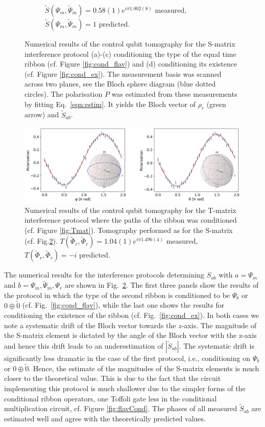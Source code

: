 \documentclass[a4paper,twocolumn,11pt, accepted=2024-06-14]{quantumarticle}
\begin{document}
\begin{figure}
\begin{subfigure}{\textwidth}
        \caption{$\tilde{S}(\Psi_m, \tilde{\Psi}_m) = 0.58(1)e^{i\pi 1.002(8)}$ measured, $\tilde{S}(\Psi_m, \tilde{\Psi}_m)=1$ predicted.}
        \label{fig:ex_cond_res_zero}
    \end{subfigure}
    \caption{Numerical results of the control qubit tomography for the S-matrix interference protocol (a)-(c) conditioning the type of the equal time ribbon (cf. Figure \ref{fig:cond_flav}) and (d) conditioning its existence (cf. Figure \ref{fig:cond_ex}). The measurement basis was scanned across two planes, see the Bloch sphere diagram (blue dotted circles). The polarisation $P$ was estimated from these measurements by fitting Eq.~\eqref{eqn:estim}. It yields the Bloch vector of $\rho_c$ (green arrow) and $\tilde S_{ab}$.}
    \label{fig:S_res}
\end{figure}
\begin{figure}
    \centering
    \includegraphics[width=\textwidth]{Figures/t_j_minus.pdf}
    \caption{Numerical results of the control qubit tomography for the T-matrix interference protocol where the paths of the ribbon was conditioned (cf. Figure \ref{fig:Tmat}). Tomography performed as for the S-matrix (cf. Fig.\ref{fig:S_res}).  $T(\tilde{\Phi}_r, \tilde{\Phi}_r) = 1.04(1)e^{i\pi 1.496(4)}$ measured, $T(\tilde{\Phi}_r, \tilde{\Phi}_r) = -i$ predicted.}
    \label{fig:t_mat_results}
\end{figure}
The numerical results for the interference protocols determining $S_{ab}$ with $a=\Psi_m$ and $b=\Psi_m,\tilde \Psi_m, \Psi_r$ are shown in Fig.~\ref{fig:S_res}. The first three panels show the results of the protocol in which the type of the second ribbon is conditioned to be $\Psi_b$ or $0 \oplus \tilde 0$ (cf. Fig.~\ref{fig:cond_flav}), while the last one shows the results for conditioning the existence of the ribbon (cf. Fig.~\ref{fig:cond_ex}). In both cases we note a systematic drift of the Bloch vector towards the $z$-axis. The magnitude of the S-matrix element is dictated by the angle of the Bloch vector with the z-axis and hence this drift leads to an underestimation of $|\tilde S_{ab}|$. The systematic drift is significantly less dramatic in the case of the first protocol, i.e., conditioning on $\Psi_b$ or $0 \oplus \tilde 0$.  Hence, the estimate of the magnitudes of the S-matrix elements is much closer to the theoretical value. 
 This is due to the fact that the circuit implementing this protocol is much shallower due to the simpler forms of the conditional ribbon operators, one Toffoli gate less in the conditional multiplication circuit, cf. Figure \ref{fig:flavCond}. The phases of all measured $\tilde S_{ab}$ are estimated well and agree with the theoretically predicted values.
\end{document}
